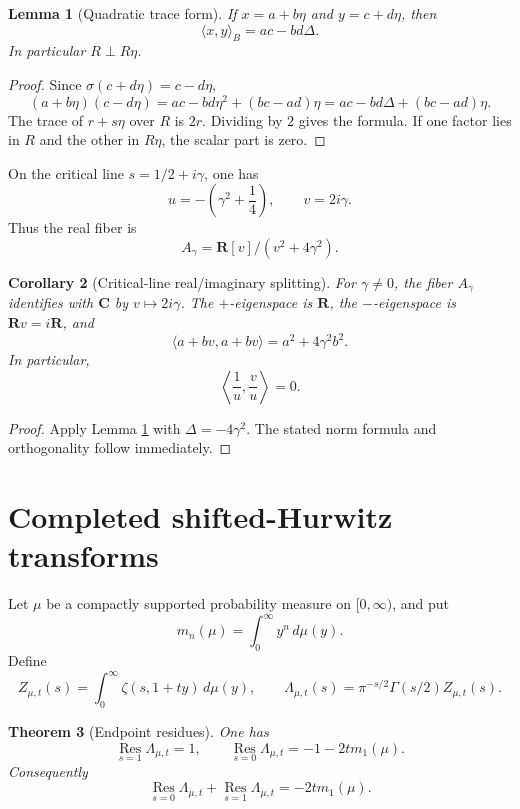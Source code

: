 \documentclass[11pt]{article}
\newcommand{\C}{\mathbf C}
\newcommand{\R}{\mathbf R}
\newcommand{\Res}{\operatorname*{Res}}
\theoremstyle{plain}
\newtheorem{theorem}{Theorem}[section]
\newtheorem{lemma}[theorem]{Lemma}
\newtheorem{corollary}[theorem]{Corollary}
\theoremstyle{definition}
\numberwithin{equation}{section}
\begin{document}
\begin{lemma}[Quadratic trace form]\label{lem:trace-form}
If \(x=a+b\eta\) and \(y=c+d\eta\), then
\[
 \langle x,y\rangle_B=ac-bd\Delta.
\]
In particular \(R\perp R\eta\).
\end{lemma}

\begin{proof}
Since \(\sigma(c+d\eta)=c-d\eta\),
\[
 (a+b\eta)(c-d\eta)=ac-bd\eta^2+(bc-ad)\eta=ac-bd\Delta+(bc-ad)\eta.
\]
The trace of \(r+s\eta\) over \(R\) is \(2r\).  Dividing by \(2\) gives the formula.  If one factor lies in \(R\) and the other in \(R\eta\), the scalar part is zero.
\end{proof}

On the critical line \(s=1/2+i\gamma\), one has
\[
 u=-\left(\gamma^2+\frac14\right),
 \qquad
 v=2i\gamma.
\]
Thus the real fiber is
\[
 A_\gamma=\R[v]/(v^2+4\gamma^2).
\]

\begin{corollary}[Critical-line real/imaginary splitting]
For \(\gamma\ne0\), the fiber \(A_\gamma\) identifies with \(\C\) by \(v\mapsto 2i\gamma\).  The \(+\)-eigenspace is \(\R\), the \(-\)-eigenspace is \(\R v=i\R\), and
\[
 \langle a+bv,a+bv\rangle=a^2+4\gamma^2b^2.
\]
In particular,
\[
 \left\langle \frac1u,\frac vu\right\rangle=0.
\]
\end{corollary}

\begin{proof}
Apply Lemma \ref{lem:trace-form} with \(\Delta=-4\gamma^2\).  The stated norm formula and orthogonality follow immediately.
\end{proof}

\section{Completed shifted-Hurwitz transforms}\label{sec:hurwitz}

Let \(\mu\) be a compactly supported probability measure on \([0,\infty)\), and put
\[
 m_n(\mu)=\int_0^\infty y^n\,d\mu(y).
\]
Define
\[
 Z_{\mu,t}(s)=\int_0^\infty\zeta(s,1+ty)\,d\mu(y),
 \qquad
 \Lambda_{\mu,t}(s)=\pi^{-s/2}\Gamma(s/2)Z_{\mu,t}(s).
\]

\begin{theorem}[Endpoint residues]\label{thm:endpoint-residues}
One has
\[
 \Res_{s=1}\Lambda_{\mu,t}=1,
 \qquad
 \Res_{s=0}\Lambda_{\mu,t}=-1-2tm_1(\mu).
\]
Consequently
\[
 \Res_{s=0}\Lambda_{\mu,t}+\Res_{s=1}\Lambda_{\mu,t}=-2tm_1(\mu).
\]
\end{theorem}
\end{document}
